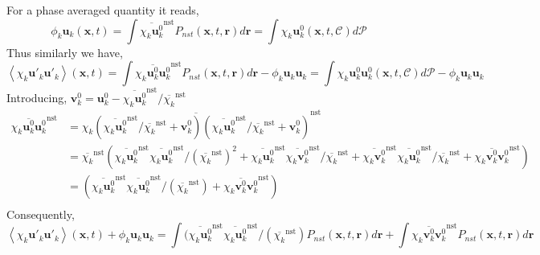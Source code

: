 \documentclass[12pt]{My_preprint}
\newcommand{\avg}[1]{\left<#1\right>}
\renewcommand{\avg}[1]{\left<#1\right>}
\newcommand{\nstavg}[1]{\overline{#1}^\text{nst}}
\newcommand{\CC}{\mathscr{C}}
\newcommand{\PP}{\mathscr{P}}
\begin{document}
For a phase averaged quantity it reads, 
\begin{equation*}
    \phi_k \textbf{u}_k(\textbf{x},t)
    = \int \nstavg{\chi_k \textbf{u}_k^0}  P_{nst}(\textbf{x},t,\textbf{r}) d\textbf{r}
    = \int  \chi_k \textbf{u}^0_k(\textbf{x},t,\CC) d\PP 
\end{equation*}
Thus similarly we have, 
\begin{equation*}
    \avg{\chi_k \textbf{u}'_k\textbf{u}'_k}(\textbf{x},t)
    = \int \nstavg{\chi_k \textbf{u}_k^0\textbf{u}_k^0}  P_{nst}(\textbf{x},t,\textbf{r}) d\textbf{r}
    - \phi_k \textbf{u}_k\textbf{u}_k
    = \int  \chi_k \textbf{u}^0_k\textbf{u}^0_k(\textbf{x},t,\CC) d\PP 
    - \phi_k \textbf{u}_k\textbf{u}_k
\end{equation*}
Introducing, $\textbf{v}_k^0  = \textbf{u}_k^0 - \nstavg{\chi_k \textbf{u}^0_k} / \nstavg{\chi_k}$
\begin{align*}
    \nstavg{\chi_k \textbf{u}_k^0\textbf{u}_k^0} 
    &= 
    \nstavg{\chi_k (\nstavg{\chi_k \textbf{u}^0_k} / \nstavg{\chi_k} + \textbf{v}_k^0)(\nstavg{\chi_k \textbf{u}^0_k} / \nstavg{\chi_k} + \textbf{v}_k^0)} \\
    &= 
    \nstavg{\chi_k} (\nstavg{\chi_k \textbf{u}^0_k}  \nstavg{\chi_k \textbf{u}^0_k} / (\nstavg{\chi_k})^2 
    + \nstavg{\chi_k \textbf{u}^0_k} \nstavg{\chi_k\textbf{v}_k^0}/ \nstavg{\chi_k}
    + \nstavg{\chi_k\textbf{v}_k^0} \nstavg{\chi_k \textbf{u}^0_k} / \nstavg{\chi_k}
    + \nstavg{\chi_k \textbf{v}_k^0\textbf{v}_k^0}
    )\\
    &= 
     (\nstavg{\chi_k \textbf{u}^0_k}  \nstavg{\chi_k \textbf{u}^0_k} / (\nstavg{\chi_k})
    + \nstavg{\chi_k \textbf{v}_k^0\textbf{v}_k^0}
    )\\
\end{align*}
Consequently, 
\begin{equation*}
    \avg{\chi_k \textbf{u}'_k\textbf{u}'_k}(\textbf{x},t)
    + \phi_k \textbf{u}_k\textbf{u}_k
    = 
    \int (\nstavg{\chi_k \textbf{u}^0_k}  \nstavg{\chi_k \textbf{u}^0_k} / (\nstavg{\chi_k})  P_{nst}(\textbf{x},t,\textbf{r}) d\textbf{r}
    +\int \nstavg{\chi_k \textbf{v}_k^0\textbf{v}_k^0}  P_{nst}(\textbf{x},t,\textbf{r}) d\textbf{r}
\end{equation*}
\end{document}
